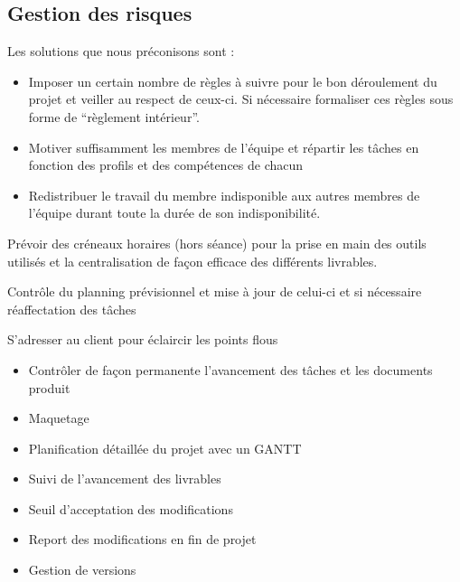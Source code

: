 \subsection{Gestion des risques}

Les solutions que nous préconisons sont :
    \item[S1]{
        \begin{itemize}
            \item Imposer un certain nombre de règles à suivre pour le bon déroulement du projet et veiller au respect de ceux-ci. Si nécessaire formaliser ces règles sous forme de “règlement intérieur”.
            \item Motiver suffisamment les membres de l’équipe  et répartir les tâches en fonction des profils et des compétences de chacun
            \item Redistribuer le travail du membre indisponible aux autres membres de l’équipe durant toute la durée de son indisponibilité.
        \end{itemize}}
    \item[S2]{
        Prévoir des créneaux horaires (hors séance) pour la prise en main des outils utilisés  et la centralisation de façon efficace des différents livrables.}

    \item[S3]{
        Contrôle du planning prévisionnel et mise à jour de celui-ci et si nécessaire réaffectation des tâches}
    \item[S4]{
        S’adresser au client pour éclaircir les points flous}
    \item[S5]{
        \begin{itemize}
            \item Contrôler de façon permanente l’avancement des tâches et les documents produit
            \item Maquetage
        \end{itemize}}
    \item[S6]{
        \begin{itemize}
            \item Planification détaillée du projet avec un GANTT
            \item Suivi de l’avancement des livrables
        \end{itemize}}
    \item[S7]{
        \begin{itemize}
            \item Seuil d’acceptation des modifications
            \item Report des modifications en fin de projet
            \item Gestion de versions
        \end{itemize}}
